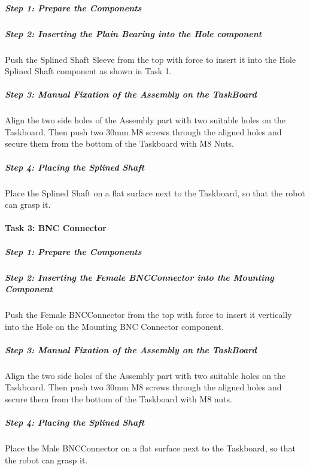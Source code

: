 \documentclass[letterpaper,10pt,english]{sphinxmanual}
\begin{document}
\subparagraph{Step 1: Prepare the Components}
\label{\detokenize{1-Assembly-Instructions-Peg-in-Hole:id1}}

\subparagraph{Step 2: Inserting the Plain Bearing into the Hole component}
\label{\detokenize{1-Assembly-Instructions-Peg-in-Hole:id2}}
\sphinxAtStartPar
Push the Splined Shaft Sleeve from the top with force to insert it into the Hole Splined Shaft component as shown in Task 1.


\subparagraph{Step 3: Manual Fixation of the Assembly on the Task\sphinxhyphen{}Board}
\label{\detokenize{1-Assembly-Instructions-Peg-in-Hole:id3}}
\sphinxAtStartPar
Align the two side holes of the Assembly part with two suitable holes on the Taskboard.
Then push two 30mm M8 screws through the aligned holes and secure them from the bottom of the Taskboard with M8 Nuts.


\subparagraph{Step 4: Placing the Splined Shaft}
\label{\detokenize{1-Assembly-Instructions-Peg-in-Hole:step-4-placing-the-splined-shaft}}
\sphinxAtStartPar
Place the Splined Shaft on a flat surface next to the Taskboard, so that the robot can grasp it.


\paragraph{Task 3: BNC Connector}
\label{\detokenize{1-Assembly-Instructions-Peg-in-Hole:task-3-bnc-connector}}

\subparagraph{Step 1: Prepare the Components}
\label{\detokenize{1-Assembly-Instructions-Peg-in-Hole:id4}}

\subparagraph{Step 2: Inserting the Female BNC\sphinxhyphen{}Connector into the Mounting Component}
\label{\detokenize{1-Assembly-Instructions-Peg-in-Hole:step-2-inserting-the-female-bnc-connector-into-the-mounting-component}}
\sphinxAtStartPar
Push the Female BNC\sphinxhyphen{}Connector from the top with force to insert it vertically into the Hole on the Mounting BNC Connector component.


\subparagraph{Step 3: Manual Fixation of the Assembly on the Task\sphinxhyphen{}Board}
\label{\detokenize{1-Assembly-Instructions-Peg-in-Hole:id5}}
\sphinxAtStartPar
Align the two side holes of the Assembly part with two suitable holes on the Taskboard.
Then push two 30mm M8 screws through the aligned holes and secure them from the bottom of the Taskboard with M8 nuts.


\subparagraph{Step 4: Placing the Splined Shaft}
\label{\detokenize{1-Assembly-Instructions-Peg-in-Hole:id6}}
\sphinxAtStartPar
Place the Male BNC\sphinxhyphen{}Connector on a flat surface next to the Taskboard, so that the robot can grasp it.
\end{document}
